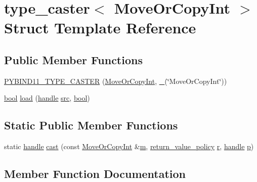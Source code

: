 \hypertarget{structtype__caster_3_01_move_or_copy_int_01_4}{}\section{type\+\_\+caster$<$ Move\+Or\+Copy\+Int $>$ Struct Template Reference}
\label{structtype__caster_3_01_move_or_copy_int_01_4}
\subsection*{Public Member Functions}
\begin{DoxyCompactItemize}
\item 
\mbox{\hyperlink{structtype__caster_3_01_move_or_copy_int_01_4_a88573a9d583d71125904b8766eecba81}{P\+Y\+B\+I\+N\+D11\+\_\+\+T\+Y\+P\+E\+\_\+\+C\+A\+S\+T\+ER}} (\mbox{\hyperlink{class_move_or_copy_int}{Move\+Or\+Copy\+Int}}, \mbox{\hyperlink{descr_8h_af114703e20c6527e87163eb2798f74b8}{\+\_\+}}(\char`\"{}Move\+Or\+Copy\+Int\char`\"{}))
\item 
\mbox{\hyperlink{asdl_8h_af6a258d8f3ee5206d682d799316314b1}{bool}} \mbox{\hyperlink{structtype__caster_3_01_move_or_copy_int_01_4_a69ad2ad06da0da0f83ce3c37093d775b}{load}} (\mbox{\hyperlink{classhandle}{handle}} \mbox{\hyperlink{_s_d_l__opengl__glext_8h_a72e0fdf0f845ded60b1fada9e9195cd7}{src}}, \mbox{\hyperlink{asdl_8h_af6a258d8f3ee5206d682d799316314b1}{bool}})
\end{DoxyCompactItemize}
\subsection*{Static Public Member Functions}
\begin{DoxyCompactItemize}
\item 
static \mbox{\hyperlink{classhandle}{handle}} \mbox{\hyperlink{structtype__caster_3_01_move_or_copy_int_01_4_acf17c9c44a0d13946d0bbd801ad96441}{cast}} (const \mbox{\hyperlink{class_move_or_copy_int}{Move\+Or\+Copy\+Int}} \&\mbox{\hyperlink{_s_d_l__opengl__glext_8h_af593500c283bf1a787a6f947f503a5c2}{m}}, \mbox{\hyperlink{detail_2common_8h_adde72ab1fb0dd4b48a5232c349a53841}{return\+\_\+value\+\_\+policy}} \mbox{\hyperlink{_s_d_l__opengl_8h_a42ce7cdc612e53abee15043f80220d97}{r}}, \mbox{\hyperlink{classhandle}{handle}} \mbox{\hyperlink{_s_d_l__opengl__glext_8h_aa5367c14d90f462230c2611b81b41d23}{p}})
\end{DoxyCompactItemize}


\subsection{Member Function Documentation}
\mbox{\label{structtype__caster_3_01_move_or_copy_int_01_4_acf17c9c44a0d13946d0bbd801ad96441}} 
